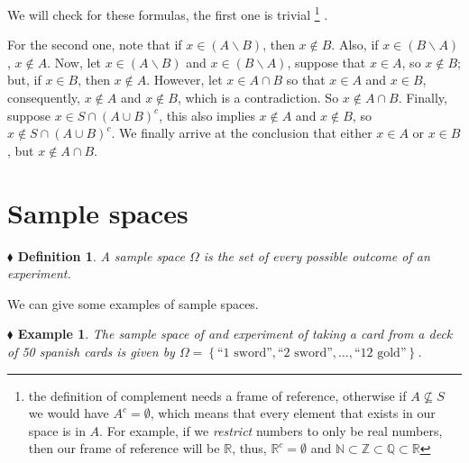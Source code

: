 \documentclass{report}
\newcommand*{\daggerfootnote}[1]{%
  \begingroup
  \renewcommand*{\thefootnote}{\fnsymbol{footnote}}%
  \footnote{#1}%
  \endgroup
}
\newtheorem{example}{$\blacklozenge$ Example}[chapter]
\newtheorem{definition}{$\blacklozenge$ Definition}[chapter]
\begin{document}
We will check for these formulas, the first one is trivial \daggerfootnote{the definition of complement needs a frame of reference, otherwise if $A\nsubseteq S$ 
we would have $A^{c} = \emptyset$, which means that every element that exists in our space is in $A$.
For example, if we \textit{restrict} numbers to only be real numbers, then our frame of reference will 
be $\mathbb{R}$, thus, $\mathbb{R}^{c} = \emptyset$ and $\mathbb{N}\subset\mathbb{Z}\subset\mathbb{Q}\subset\mathbb{R}$}. 

For the second one, note that if $x\in (A\backslash B)$, 
then $x\notin B$. Also, if $x\in (B\backslash A)$, $x\notin A$. Now, let $x\in (A\backslash B)$ and $x\in (B \backslash A)$, 
suppose that $x\in A$, so $x\notin B$; but, if $x\in B$, then $x\notin A$. However, let $x\in A\cap B$ so that $x\in A$ and $x\in B$,
consequently, $x\notin A$ and $x\notin B$, which is a contradiction. So $x\notin A\cap B$. Finally, suppose $x\in S\cap (A\cup B)^{c}$,
this also implies $x\notin A$ and $x \notin B$, so $x\notin S\cap(A\cup B)^{c}$. We finally arrive at the conclusion that 
either $x\in A$ or $x\in B$, but $x\notin A\cap B$.

\section{Sample spaces}
\begin{definition}
    A sample space $\Omega$ is the set of \textit{every} possible outcome 
    of an experiment.
\end{definition}
We can give some examples of sample spaces.
\begin{example}
    The sample space of and experiment of taking a card from a deck of 50 spanish cards is 
    given by $\Omega = \left\{\text{``1 sword''}, \text{``2 sword''}, \dots, \text{``12 gold''}\right\}$.
\end{example}
\end{document}
